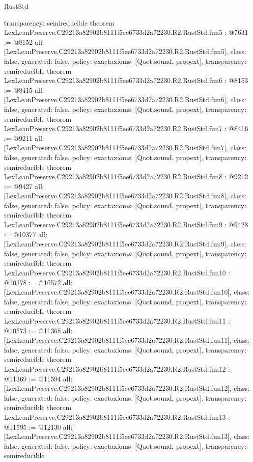 \begin{lexlean}{RustStd}
\begin{coremodule}
{  transparency: semireducible
}
theorem LexLeanPreserve.C29213a82902b8111f5ee6733d2a72230.R2.RustStd.fun5 : @7631 := @8152 {
  all: [LexLeanPreserve.C29213a82902b8111f5ee6733d2a72230.R2.RustStd.fun5],
  class: false,
  generated: false,
  policy: exact{axioms: [Quot.sound, propext]},
  transparency: semireducible
}
theorem LexLeanPreserve.C29213a82902b8111f5ee6733d2a72230.R2.RustStd.fun6 : @8153 := @8415 {
  all: [LexLeanPreserve.C29213a82902b8111f5ee6733d2a72230.R2.RustStd.fun6],
  class: false,
  generated: false,
  policy: exact{axioms: [Quot.sound, propext]},
  transparency: semireducible
}
theorem LexLeanPreserve.C29213a82902b8111f5ee6733d2a72230.R2.RustStd.fun7 : @8416 := @9211 {
  all: [LexLeanPreserve.C29213a82902b8111f5ee6733d2a72230.R2.RustStd.fun7],
  class: false,
  generated: false,
  policy: exact{axioms: [Quot.sound, propext]},
  transparency: semireducible
}
theorem LexLeanPreserve.C29213a82902b8111f5ee6733d2a72230.R2.RustStd.fun8 : @9212 := @9427 {
  all: [LexLeanPreserve.C29213a82902b8111f5ee6733d2a72230.R2.RustStd.fun8],
  class: false,
  generated: false,
  policy: exact{axioms: [Quot.sound, propext]},
  transparency: semireducible
}
theorem LexLeanPreserve.C29213a82902b8111f5ee6733d2a72230.R2.RustStd.fun9 : @9428 := @10377 {
  all: [LexLeanPreserve.C29213a82902b8111f5ee6733d2a72230.R2.RustStd.fun9],
  class: false,
  generated: false,
  policy: exact{axioms: [Quot.sound, propext]},
  transparency: semireducible
}
theorem LexLeanPreserve.C29213a82902b8111f5ee6733d2a72230.R2.RustStd.fun10 : @10378 := @10572 {
  all: [LexLeanPreserve.C29213a82902b8111f5ee6733d2a72230.R2.RustStd.fun10],
  class: false,
  generated: false,
  policy: exact{axioms: [Quot.sound, propext]},
  transparency: semireducible
}
theorem LexLeanPreserve.C29213a82902b8111f5ee6733d2a72230.R2.RustStd.fun11 : @10573 := @11368 {
  all: [LexLeanPreserve.C29213a82902b8111f5ee6733d2a72230.R2.RustStd.fun11],
  class: false,
  generated: false,
  policy: exact{axioms: [Quot.sound, propext]},
  transparency: semireducible
}
theorem LexLeanPreserve.C29213a82902b8111f5ee6733d2a72230.R2.RustStd.fun12 : @11369 := @11594 {
  all: [LexLeanPreserve.C29213a82902b8111f5ee6733d2a72230.R2.RustStd.fun12],
  class: false,
  generated: false,
  policy: exact{axioms: [Quot.sound, propext]},
  transparency: semireducible
}
theorem LexLeanPreserve.C29213a82902b8111f5ee6733d2a72230.R2.RustStd.fun13 : @11595 := @12130 {
  all: [LexLeanPreserve.C29213a82902b8111f5ee6733d2a72230.R2.RustStd.fun13],
  class: false,
  generated: false,
  policy: exact{axioms: [Quot.sound, propext]},
  transparency: semireducible
}
\end{coremodule}
\end{lexlean}
